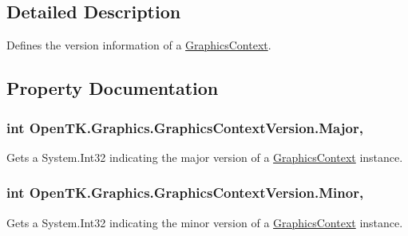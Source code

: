 \subsection{Detailed Description}
Defines the version information of a \hyperlink{class_open_t_k_1_1_graphics_1_1_graphics_context}{Graphics\-Context}. 



\subsection{Property Documentation}
\hypertarget{class_open_t_k_1_1_graphics_1_1_graphics_context_version_abe76536cbbf5c6d06280a3508409af1f}{
\subsubsection[{Major}]{\setlength{\rightskip}{0pt plus 5cm}int Open\-T\-K.\-Graphics.\-Graphics\-Context\-Version.\-Major\hspace{0.3cm}{\ttfamily [get]}, {\ttfamily [set]}}}\label{class_open_t_k_1_1_graphics_1_1_graphics_context_version_abe76536cbbf5c6d06280a3508409af1f}


Gets a System.\-Int32 indicating the major version of a \hyperlink{class_open_t_k_1_1_graphics_1_1_graphics_context}{Graphics\-Context} instance. 

\hypertarget{class_open_t_k_1_1_graphics_1_1_graphics_context_version_a66ad81b880edae4f65c9f3b7eeba6c53}{
\subsubsection[{Minor}]{\setlength{\rightskip}{0pt plus 5cm}int Open\-T\-K.\-Graphics.\-Graphics\-Context\-Version.\-Minor\hspace{0.3cm}{\ttfamily [get]}, {\ttfamily [set]}}}\label{class_open_t_k_1_1_graphics_1_1_graphics_context_version_a66ad81b880edae4f65c9f3b7eeba6c53}


Gets a System.\-Int32 indicating the minor version of a \hyperlink{class_open_t_k_1_1_graphics_1_1_graphics_context}{Graphics\-Context} instance. 

